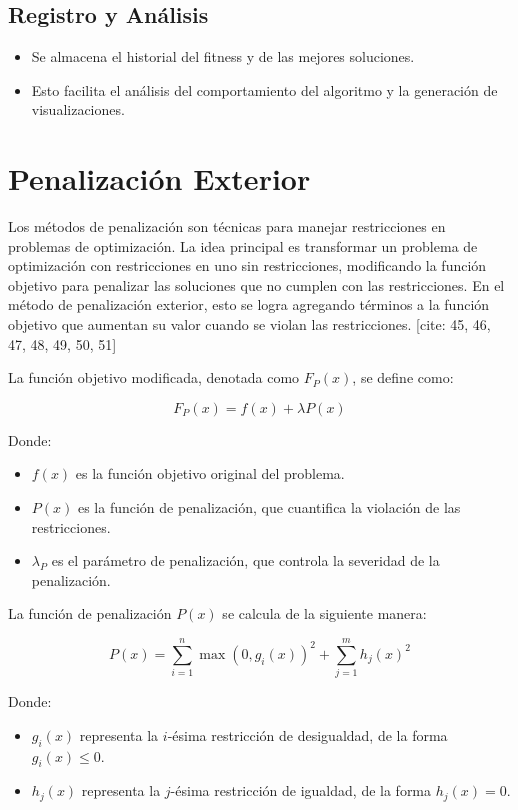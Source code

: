\subsection*{Registro y An\'alisis}
\begin{itemize}
    \item Se almacena el historial del fitness y de las mejores soluciones.
    \item Esto facilita el an\'alisis del comportamiento del algoritmo y la generaci\'on de visualizaciones.
\end{itemize}

\section{Penalización Exterior}

Los métodos de penalización son técnicas para manejar restricciones en problemas de optimización. La idea principal es transformar un problema de optimización con restricciones en uno sin restricciones, modificando la función objetivo para penalizar las soluciones que no cumplen con las restricciones. En el método de penalización exterior, esto se logra agregando términos a la función objetivo que aumentan su valor cuando se violan las restricciones. [cite: 45, 46, 47, 48, 49, 50, 51]

La función objetivo modificada, denotada como \( F_P(x) \), se define como:

\[
F_P(x) = f(x) + \lambda P(x)
\]

Donde:

\begin{itemize}
    \item \( f(x) \) es la función objetivo original del problema.
    \item \( P(x) \) es la función de penalización, que cuantifica la violación de las restricciones.
    \item \( \lambda_P \) es el parámetro de penalización, que controla la severidad de la penalización.
\end{itemize}

La función de penalización \( P(x) \) se calcula de la siguiente manera:

\[
P(x) = \sum_{i=1}^{n} \max(0, g_i(x))^2 + \sum_{j=1}^{m} h_j(x)^2
\]

Donde:

\begin{itemize}
    \item \( g_i(x) \) representa la \( i \)-ésima restricción de desigualdad, de la forma \( g_i(x) \leq 0 \).
    \item \( h_j(x) \) representa la \( j \)-ésima restricción de igualdad, de la forma \( h_j(x) = 0 \).
\end{itemize}

